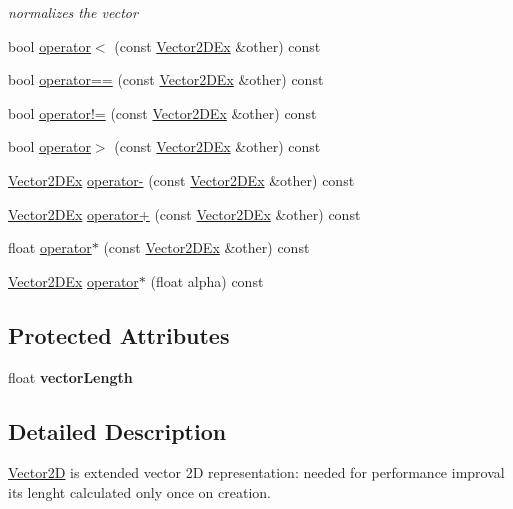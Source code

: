 \begin{DoxyCompactItemize}
\begin{DoxyCompactList}\small\item\em normalizes the vector \end{DoxyCompactList}\item 
bool \hyperlink{class_vector2_d_ex_ad04d2fb966beeb1bec2a3d1853229893}{operator$<$} (const \hyperlink{class_vector2_d_ex}{\-Vector2\-D\-Ex} \&other) const 
\item 
bool \hyperlink{class_vector2_d_ex_aadc4c42ec7bd0e8e950cf115df06cd5f}{operator==} (const \hyperlink{class_vector2_d_ex}{\-Vector2\-D\-Ex} \&other) const 
\item 
bool \hyperlink{class_vector2_d_ex_a46bf927a988ecf4e989b4e5b5b650920}{operator!=} (const \hyperlink{class_vector2_d_ex}{\-Vector2\-D\-Ex} \&other) const 
\item 
bool \hyperlink{class_vector2_d_ex_aac71e2c5fdd311eb054b2816ecf52d3b}{operator$>$} (const \hyperlink{class_vector2_d_ex}{\-Vector2\-D\-Ex} \&other) const 
\item 
\hyperlink{class_vector2_d_ex}{\-Vector2\-D\-Ex} \hyperlink{class_vector2_d_ex_acba6747aab9303559b70fad8a0acc1f0}{operator-\/} (const \hyperlink{class_vector2_d_ex}{\-Vector2\-D\-Ex} \&other) const 
\item 
\hyperlink{class_vector2_d_ex}{\-Vector2\-D\-Ex} \hyperlink{class_vector2_d_ex_a3185eaecde6d7528ce387bbfe5d3d2e1}{operator+} (const \hyperlink{class_vector2_d_ex}{\-Vector2\-D\-Ex} \&other) const 
\item 
float \hyperlink{class_vector2_d_ex_a29ebb19db45bacb18f5ec0245157adf9}{operator$\ast$} (const \hyperlink{class_vector2_d_ex}{\-Vector2\-D\-Ex} \&other) const 
\item 
\hyperlink{class_vector2_d_ex}{\-Vector2\-D\-Ex} \hyperlink{class_vector2_d_ex_a364160ffff956a04265f218d0ba5d5ce}{operator$\ast$} (float alpha) const 
\end{DoxyCompactItemize}
\subsection*{\-Protected \-Attributes}
\begin{DoxyCompactItemize}
\item 
\hypertarget{class_vector2_d_ex_a0429aeb06448a9415da2fc8994d6d587}{
float {\bfseries vector\-Length}}
\label{class_vector2_d_ex_a0429aeb06448a9415da2fc8994d6d587}

\end{DoxyCompactItemize}


\subsection{\-Detailed \-Description}
\hyperlink{class_vector2_d}{\-Vector2\-D} is extended vector 2\-D representation\-: needed for performance improval its lenght calculated only once on creation. 

